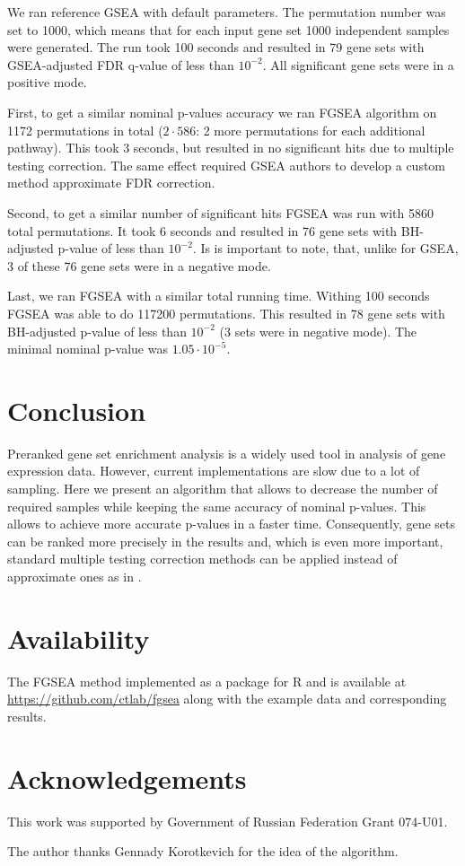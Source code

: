 \documentclass[runningheads,a4paper]{llncs}
\begin{document}
We ran reference GSEA with default parameters. The permutation number 
was set to 1000, which means that for each input gene set 1000 independent
samples were generated. The run took 100 seconds and resulted
in 79 gene sets with GSEA-adjusted FDR q-value of less than $10^{-2}$. All
significant gene sets were in a positive mode.

First, to get a similar nominal p-values accuracy we ran FGSEA algorithm on
1172 permutations in total ($2\cdot586$: 2 more permutations for each 
additional pathway). This took 3 seconds, but resulted
in no significant hits due to multiple testing correction. The same
effect required GSEA authors to develop a custom method approximate FDR correction.

Second, to get a similar number of significant hits FGSEA
was run with 5860 total permutations.
It took 6 seconds and resulted in 
76 gene sets with BH-adjusted p-value of less than $10^{-2}$. Is is important
to note, that, unlike for GSEA, 3 of these 76 gene sets were in a negative mode.

Last, we ran FGSEA with a similar total running time. Withing 100 seconds
FGSEA was able to do 117200 permutations. This resulted in
78 gene sets with BH-adjusted p-value of less than $10^{-2}$ (3 sets
were in negative mode). The minimal nominal p-value was $1.05\cdot10^{-5}$. 

\section{Conclusion}

Preranked gene set enrichment analysis is a widely used tool in analysis of
gene expression data. However, current implementations are slow due to 
a lot of sampling. Here we present an algorithm that allows to decrease
the number of required samples while keeping the same accuracy 
of nominal p-values. This allows to achieve more accurate p-values
in a faster time. Consequently, gene sets can be ranked more
precisely in the results and, which is even more important, 
standard multiple testing
correction methods can be applied instead of approximate ones
as in \cite{Subramanian2005}. 

\section*{Availability}\label{secion_availability}

The FGSEA method implemented as a package for R and is available at 
\url{https://github.com/ctlab/fgsea} along with the example data
and corresponding results.

\section*{Acknowledgements}\label{secion_acknowledgements}

This work was supported by Government of Russian Federation Grant 074-U01.

The author thanks Gennady Korotkevich for the idea of the algorithm.

{}

\end{document}
